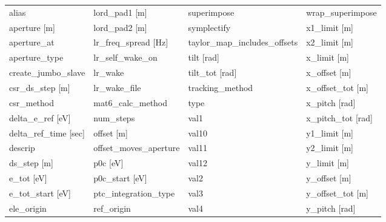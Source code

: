  \begin{tabular}{llll} \toprule
alias                            & lord_pad1 [m]                    & superimpose                      & wrap_superimpose                 \\
aperture [m]                     & lord_pad2 [m]                    & symplectify                      & x1_limit [m]                     \\
aperture_at                      & lr_freq_spread [Hz]              & taylor_map_includes_offsets      & x2_limit [m]                     \\
aperture_type                    & lr_self_wake_on                  & tilt [rad]                       & x_limit [m]                      \\
create_jumbo_slave               & lr_wake                          & tilt_tot [rad]                   & x_offset [m]                     \\
csr_ds_step [m]                  & lr_wake_file                     & tracking_method                  & x_offset_tot [m]                 \\
csr_method                       & mat6_calc_method                 & type                             & x_pitch [rad]                    \\
delta_e_ref [eV]                 & num_steps                        & val1                             & x_pitch_tot [rad]                \\
delta_ref_time [sec]             & offset [m]                       & val10                            & y1_limit [m]                     \\
descrip                          & offset_moves_aperture            & val11                            & y2_limit [m]                     \\
ds_step [m]                      & p0c [eV]                         & val12                            & y_limit [m]                      \\
e_tot [eV]                       & p0c_start [eV]                   & val2                             & y_offset [m]                     \\
e_tot_start [eV]                 & ptc_integration_type             & val3                             & y_offset_tot [m]                 \\
ele_origin                       & ref_origin                       & val4                             & y_pitch [rad]                    \\

\end{tabular}
